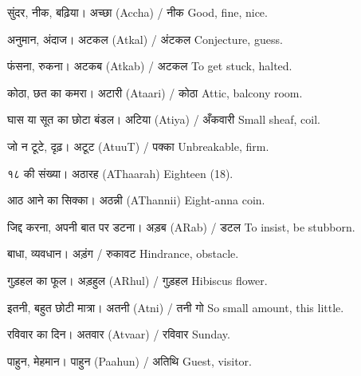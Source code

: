 %
{सुंदर, नीक, बढ़िया।}%
{अच्छा (Accha) / नीक}%
{Good, fine, nice.}

%
{अनुमान, अंदाज।}%
{अटकल (Atkal) / अंटकल}%
{Conjecture, guess.}

%
{फंसना, रुकना।}%
{अटकब (Atkab) / अटकल}%
{To get stuck, halted.}

%
{कोठा, छत का कमरा।}%
{अटारी (Ataari) / कोठा}%
{Attic, balcony room.}

%
{घास या सूत का छोटा बंडल।}%
{अटिया (Atiya) / अँकवारी}%
{Small sheaf, coil.}

%
{जो न टूटे, दृढ़।}%
{अटूट (AtuuT) / पक्का}%
{Unbreakable, firm.}

%
{१८ की संख्या।}%
{अठारह (AThaarah)}%
{Eighteen (18).}

%
{आठ आने का सिक्का।}%
{अठन्नी (AThannii)}%
{Eight-anna coin.}

%
{जिद्द करना, अपनी बात पर डटना।}%
{अड़ब (ARab) / डटल}%
{To insist, be stubborn.}

%
{बाधा, व्यवधान।}%
{अड़ंग / रुकावट}%
{Hindrance, obstacle.}

%
{गुड़हल का फूल।}%
{अड़हुल (ARhul) / गुड़हल}%
{Hibiscus flower.}

%
{इतनी, बहुत छोटी मात्रा।}%
{अतनी (Atni) / तनी गो}%
{So small amount, this little.}

%
{रविवार का दिन।}%
{अतवार (Atvaar) / रविवार}%
{Sunday.}

%
{पाहुन, मेहमान।}%
{पाहुन (Paahun) / अतिथि}%
{Guest, visitor.}

